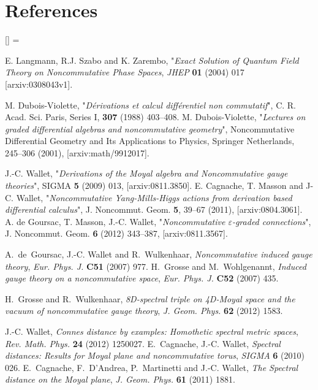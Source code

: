 \documentclass[a4paper,11pt,twoside]{article}
\numberwithin{equation}{section}
\theoremstyle{nonumberplain}
\newcounter{and}
\renewenvironment{thebibliography}[1]{%
\section*{References}%
\frenchspacing\small%
\begin{list}{[\arabic{enumi}]}%
{%
\usecounter{enumi}\parsep=2pt\topsep 0pt%
\settowidth{\labelwidth}{[#1]}%
\leftmargin=\labelwidth\advance\leftmargin\labelsep%
\rightmargin=0pt\itemsep=1pt\sloppy%
}%
}{\end{list}}
\begin{document}
\begin{thebibliography}{88}
%
E. Langmann, R.J. Szabo and K. Zarembo, "{\it{Exact Solution of Quantum Field Theory on Noncommutative Phase Spaces}}, {\it{JHEP}} {\bf{01}} (2004) 017
[arxiv:0308043v1].

%
M. Dubois-Violette, "{\it{D\'erivations et calcul diff\'erentiel non commutatif}}", {C. R. Acad. Sci. Paris, Series I, \textbf{307} (1988) 403--408}. M. Dubois-Violette, "{\it{Lectures on graded differential algebras and noncommutative geometry}}", Noncommutative Differential Geometry and Its Applications to Physics, Springer Netherlands, 245--306 (2001), [arxiv:math/9912017].%

%
J.-C. Wallet, "{\it{Derivations of the Moyal algebra and Noncommutative gauge theories}}", {SIGMA \textbf{5} (2009) 013}, %
[arxiv:0811.3850]. 
E. Cagnache, T. Masson and J-C. Wallet, "{\it{Noncommutative Yang-Mills-Higgs actions from derivation based differential calculus}}", {J. Noncommut. Geom. \textbf{5}, 39--67 (2011)}, [arxiv:0804.3061]. 
A. de Goursac, T. Masson, J.-C. Wallet, "{\it{Noncommutative $\varepsilon$-graded connections}}", {J. Noncommut. Geom. \textbf{6} (2012) 343--387}, %
[arxiv:0811.3567].

A.~de~Goursac, J.-C. Wallet and R.~Wulkenhaar, \textit{Noncommutative induced
  gauge theory}, \textit{Eur. Phys. J.} \textbf{C51} (2007) 977.
  H.~Grosse and M.~Wohlgenannt, \textit{Induced gauge theory on a noncommutative
  space}, \textit{Eur. Phys. J.} \textbf{C52} (2007) 435.
	
H.~Grosse and R.~Wulkenhaar, \textit{{8D-spectral triple on 4D-Moyal space and
  the vacuum of noncommutative gauge theory}}, \textit{J. Geom. Phys.}
  \textbf{62} (2012) 1583.
	
J.-C. Wallet, \textit{{Connes distance by examples: Homothetic spectral metric
  spaces}}, \textit{Rev. Math. Phys.} \textbf{24} (2012) 1250027.
   E.~Cagnache, J.-C. Wallet, \textit{{Spectral distances: Results
  for Moyal plane and noncommutative torus}}, \textit{SIGMA} \textbf{6} (2010)
  026.
  E.~Cagnache, F.~D'Andrea, P.~Martinetti and J.-C. Wallet, \textit{{The Spectral
  distance on the Moyal plane}}, \textit{J. Geom. Phys.} \textbf{61} (2011)
  1881.


\end{thebibliography}
\end{document}
